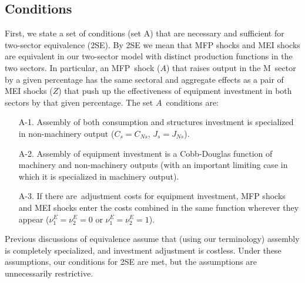 \documentclass[12pt,fleqn]{article}
\begin{document}
\subsection{Conditions} \label{conditions_for_proof}


First, we state a set of conditions (set A) that are necessary and
sufficient for two-sector equivalence (2SE). By 2SE we mean that MFP shocks
and MEI shocks are equivalent in our two-sector model with distinct
production functions in the two sectors. In particular, an MFP\ shock ($A$)
that raises output in the M\ sector by a given percentage has the same
sectoral and aggregate effects as a pair of MEI shocks ($Z$) that push up
the effectiveness of equipment investment in both sectors by that given
percentage. The set $A$\ conditions are:

\begin{enumerate}
\item[A-1.] Assembly of both consumption and structures investment is
specialized in non-machinery output ($C_{s}=C_{Ns}$, $J_{s}=J_{Ns}$).%

\item[A-2.] Assembly of equipment investment is a Cobb-Douglas function of
machinery and non-machinery outputs (with an important limiting case in which it is
specialized in machinery output).

\item[A-3.] If there are\ adjustment costs for equipment investment, MFP
shocks and MEI shocks enter the costs combined in the same function wherever
they appear ($\nu _{1}^{E}=\nu _{2}^{E}=0$ or $\nu _{1}^{E}=\nu _{2}^{E}=1$).
\end{enumerate}

\noindent Previous discussions of equivalence assume that (using our
terminology) assembly is completely specialized, and investment adjustment
is costless. Under these assumptions, our conditions
for 2SE are met, but the assumptions are unnecessarily restrictive.
\end{document}
